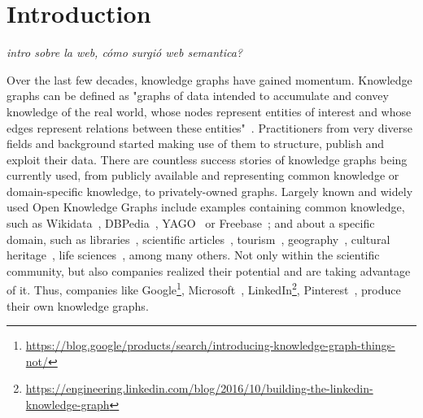\chapter{Introduction}
\label{chapter:intro}

\textit{intro sobre la web, cómo surgió web semantica?}



Over the last few decades, knowledge graphs have gained momentum. Knowledge graphs can be defined as "graphs of data intended to accumulate and convey knowledge of the real world, whose nodes represent entities of interest and whose edges represent relations between these entities"~\cite{hogan2021kg}. 
Practitioners from very diverse fields and background started making use of them to structure, publish and exploit their data. 
There are countless success stories of knowledge graphs being currently used, from publicly available and representing common knowledge or domain-specific knowledge, to privately-owned graphs. 
Largely known and widely used Open Knowledge Graphs include examples containing common knowledge, such as Wikidata~\citep{erxleben2014introducing}, DBPedia~\citep{lehmann2015dbpedia}, YAGO~\citep{pellissier2020yago} or Freebase~\citep{bollacker2007freebase}; 
and about a specific domain, such as 
libraries~\citep{vila2013datos}, 
scientific articles~\citep{stocker2023orkg}, 
tourism~\citep{karle2018building,alonso2018rioja}, 
geography~\citep{stadler2012linkedgeodata}, 
cultural heritage~\citep{carriero2019arco}, 
life sciences~\citep{dumontier2014bio2rdf,pinero2020disgenet}, among many others. 
Not only within the scientific community, but also companies realized their potential and are taking advantage of it. Thus, companies like 
Google\footnote{\url{https://blog.google/products/search/introducing-knowledge-graph-things-not/}},
Microsoft~\citep{farber2019microsoft},
LinkedIn\footnote{\url{https://engineering.linkedin.com/blog/2016/10/building-the-linkedin-knowledge-graph}}, 
Pinterest~\citep{goncalves2019pinterest},
produce their own knowledge graphs. 


